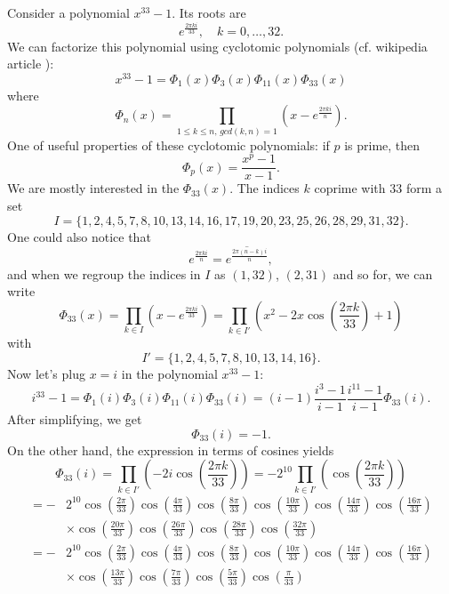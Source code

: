 \documentclass[12pt, a4paper]{article}
\begin{document}
\noindent Consider a polynomial $x^{33}-1$.
Its roots are
\[
    e^{\frac{2\pi ki}{33}},\quad k=0,\ldots,32.
\]
We can factorize this polynomial using cyclotomic polynomials (cf. wikipedia article \cite{cp}):
\[
    x^{33}-1 = \Phi_1(x) \Phi_3(x) \Phi_{11}(x)\Phi_{33}(x)
\]
where
\[
    \Phi_n(x) = \prod_{1\le k\le n,\, gcd(k,n)=1}\left(x-e^{\frac{2\pi k i}{n}}\right).
\]
One of useful properties of these cyclotomic polynomials: if $p$ is prime, then
\[
    \Phi_p(x) = \frac{x^p-1}{x-1}.
\]
We are mostly interested in the $\Phi_{33}(x)$.
The indices $k$ coprime with $33$ form a set
\[
    I = \{1, 2, 4, 5, 7, 8, 10, 13, 14, 16, 17, 19, 20, 23, 25, 26, 28, 29, 31, 32\}.
\]
One could also notice that
\[
    e^{\frac{2\pi k i}{n}} = \overline{ e^{\frac{2\pi (n - k)i}{n}}},
\]
and when we regroup the indices in $I$  as $(1, 32)$, $(2,31)$ and so for, we can write
\[
    \Phi_{33}(x) = \prod_{k\in I} \left(x-e^{\frac{2\pi k i}{33}}\right)
    =\prod_{k\in I'} \left(x^2-2x\cos\left( {\frac{2\pi k}{33}}\right)+1\right)
\]
with
\[
    I' = \{1, 2, 4, 5, 7, 8, 10, 13, 14, 16\}.
\]
Now let's plug $x=i$ in the polynomial $x^{33}-1$:
\[
    i^{33}-1 = \Phi_1(i) \Phi_3(i) \Phi_{11}(i)\Phi_{33}(i) = (i-1)\frac{i^3-1}{i-1} \frac{i^{11}-1}{i-1}\Phi_{33}(i).
\]
After simplifying, we get
\[
    \Phi_{33}(i) = -1.
\]
On the other hand, the expression in terms of cosines yields
\[
    \Phi_{33}(i) = \prod_{k\in I'}\left(-2i\cos \left( {\frac{2\pi k}{33}}\right) \right) = -2^{10}
    \prod_{k\in I'}\left(\cos \left( {\frac{2\pi k}{33}}\right) \right)
\]
\begin{align*}
    = -&2^{10}\cos \left( {\frac{2\pi}{33}}\right)
    \cos \left( {\frac{4\pi }{33}}\right)
    \cos \left( {\frac{8\pi }{33}}\right)
    \cos \left( {\frac{10\pi }{33}}\right)
    \cos \left( {\frac{14\pi }{33}}\right)
    \cos \left( {\frac{16\pi }{33}}\right)
    \\&\times
    \cos \left( {\frac{20\pi }{33}}\right)
    \cos \left( {\frac{26\pi }{33}}\right)
    \cos \left( {\frac{28\pi }{33}}\right)
    \cos \left( {\frac{32\pi }{33}}\right)
\end{align*}
\begin{align*}
    = -&2^{10}\cos \left( {\frac{2\pi}{33}}\right)
    \cos \left( {\frac{4\pi }{33}}\right)
    \cos \left( {\frac{8\pi }{33}}\right)
    \cos \left( {\frac{10\pi }{33}}\right)
    \cos \left( {\frac{14\pi }{33}}\right)
    \cos \left( {\frac{16\pi }{33}}\right)
    \\&\times
    \cos \left( {\frac{13\pi }{33}}\right)
    \cos \left( {\frac{7\pi }{33}}\right)
    \cos \left( {\frac{5\pi }{33}}\right)
    \cos \left( {\frac{\pi }{33}}\right)
\end{align*}
\end{document}
